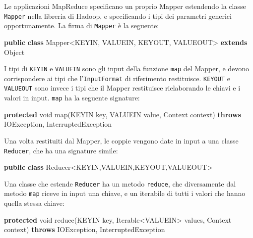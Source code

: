 \documentclass[italian,a4paper, twoside, 12pt]{report}
\newenvironment{Shaded}{}{}
\newcommand{\KeywordTok}[1]{\textcolor[rgb]{0.00,0.44,0.13}{\textbf{#1}}}
\newcommand{\DataTypeTok}[1]{\textcolor[rgb]{0.56,0.13,0.00}{#1}}
\newcommand{\FunctionTok}[1]{\textcolor[rgb]{0.02,0.16,0.49}{#1}}
\newcommand{\BuiltInTok}[1]{#1}
\newcommand{\NormalTok}[1]{#1}
\begin{document}
Le applicazioni MapReduce specificano un proprio Mapper estendendo la
classe \texttt{Mapper} nella libreria di Hadoop, e specificando i tipi
dei parametri generici opportunamente. La firma di \texttt{Mapper} è la
seguente:

\begin{Shaded}
\begin{Highlighting}[]
\KeywordTok{public} \KeywordTok{class}\NormalTok{ Mapper<KEYIN, VALUEIN, KEYOUT, VALUEOUT> }\KeywordTok{extends} \BuiltInTok{Object}
\end{Highlighting}
\end{Shaded}

I tipi di \texttt{KEYIN} e \texttt{VALUEIN} sono gli input della
funzione \texttt{map} del Mapper, e devono corrispondere ai tipi che
l'\texttt{InputFormat} di riferimento restituisce. \texttt{KEYOUT} e
\texttt{VALUEOUT} sono invece i tipi che il Mapper restituisce
rielaborando le chiavi e i valori in input. \texttt{map} ha la seguente
signature:

\begin{Shaded}
\begin{Highlighting}[]
\KeywordTok{protected} \DataTypeTok{void} \FunctionTok{map}\NormalTok{(KEYIN key, VALUEIN value, }\BuiltInTok{Context}\NormalTok{ context) }
    \KeywordTok{throws} \BuiltInTok{IOException}\NormalTok{, }\BuiltInTok{InterruptedException}
\end{Highlighting}
\end{Shaded}

Una volta restituiti dal Mapper, le coppie vengono date in input a una
classe \texttt{Reducer}, che ha una signature simile:

\begin{Shaded}
\begin{Highlighting}[]
\KeywordTok{public} \KeywordTok{class}\NormalTok{ Reducer<KEYIN,VALUEIN,KEYOUT,VALUEOUT>}
\end{Highlighting}
\end{Shaded}

Una classe che estende \texttt{Reducer} ha un metodo \texttt{reduce},
che diversamente dal metodo \texttt{map} riceve in input una chiave, e
un iterabile di tutti i valori che hanno quella stessa chiave:

\begin{Shaded}
\begin{Highlighting}[]
\KeywordTok{protected} \DataTypeTok{void} \FunctionTok{reduce}\NormalTok{(KEYIN key, }\BuiltInTok{Iterable}\NormalTok{<VALUEIN> values, }\BuiltInTok{Context}\NormalTok{ context) }
    \KeywordTok{throws} \BuiltInTok{IOException}\NormalTok{, }\BuiltInTok{InterruptedException}
\end{Highlighting}
\end{Shaded}
\end{document}

